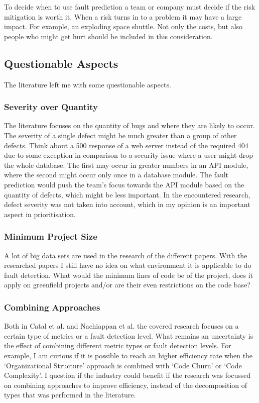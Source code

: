 To decide when to use fault prediction a team or company must decide if the risk mitigation is worth it.
When a risk turns in to a problem it may have a large impact. For example, an exploding space shuttle.
Not only the costs, but also people who might get hurt should be included in this consideration.

\subsection*{Questionable Aspects}

The literature left me with some questionable aspects.

\subsubsection*{Severity over Quantity}

The literature focuses on the quantity of bugs and where they are likely to occur.
The severity of a single defect might be much greater than a group of other defects.
Think about a 500 response of a web server instead of the required 404 due to some exception in comparison to a security issue where a user might drop the whole database.
The first may occur in greater numbers in an API module, where the second might occur only once in a database module.
The fault prediction would push the team's focus towards the API module based on the quantity of defects, which might be less important.
In the encountered research, defect severity was not taken into account, which in my opinion is an important aspect in prioritisation.

\subsubsection*{Minimum Project Size}

A lot of big data sets are used in the research of the different papers.
With the researched papers I still have no idea on what environment it is applicable to do fault detection.
What would the minimum lines of code be of the project, does it apply on greenfield projects and/or are their even restrictions on the code base?

\subsubsection*{Combining Approaches}

Both in Catal et al. \autocite{Catal20097346} and Nachiappan et al. \autocite{MAKING_SOFTWARE}
the covered research focuses on a certain type of metrics or a fault detection level.
What remains an uncertainty is the effect of combining different metric types or fault detection levels.
For example, I am curious if it is possible to reach an higher efficiency rate when the `Organizational Structure' approach is combined with `Code Churn' or `Code Complexity'.
I question if the industry could benefit if the research was focussed on combining approaches to improve efficiency, instead of the decomposition of types that was performed in the literature.

